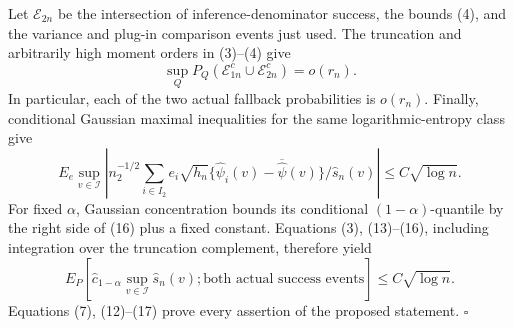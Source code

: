 Let \(\mathcal E_{2n}\) be the intersection of inference-denominator success, the bounds (4), and the variance and plug-in comparison events just used.  The truncation and arbitrarily high moment orders in (3)--(4) give
\[
 \sup_Q P_Q(\mathcal E_{1n}^c\cup\mathcal E_{2n}^c)=o(r_n). \tag{15}
\]
In particular, each of the two actual fallback probabilities is \(o(r_n)\).  Finally, conditional Gaussian maximal inequalities for the same logarithmic-entropy class give
\[
 E_e\sup_{v\in\mathcal I}\left|n_2^{-1/2}\sum_{i\in I_2}
 e_i\sqrt{h_n}\{\widehat\psi_i(v)-\overline{\widehat\psi}(v)\}/\widehat s_n(v)\right|
 \le C\sqrt{\log n}. \tag{16}
\]
For fixed \(\alpha\), Gaussian concentration bounds its conditional \((1-\alpha)\)-quantile by the right side of (16) plus a fixed constant.  Equations (3), (13)--(16), including integration over the truncation complement, therefore yield
\[
 E_P\left[\widehat c_{1-\alpha}\sup_{v\in\mathcal I}\widehat s_n(v);
 \text{both actual success events}\right]\le C\sqrt{\log n}. \tag{17}
\]
Equations (7), (12)--(17) prove every assertion of the proposed statement. \(\square\)